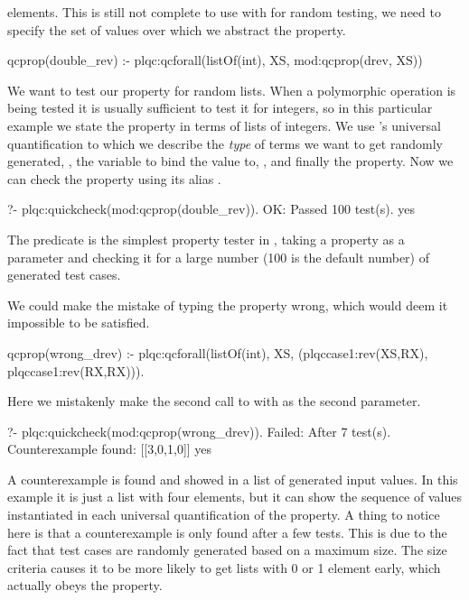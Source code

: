 elements.
%
This is still not complete to use with \plqc{} for random testing, we
need to specify the set of values over which we abstract the property.
%
\begin{yapcode}
 qcprop(double_rev) :-
   plqc:qcforall(listOf(int), XS,
                 mod:qcprop({drev, XS}))
\end{yapcode}
%
We want to test our  property for random  lists.
%
When a polymorphic operation is being tested it is usually sufficient
to test it for integers, so in this particular example
we state the property in terms of lists of integers.
%
We use \plqc{}'s universal quantification to which we describe the
\emph{type} of terms we want to get randomly generated,
, the variable to bind the value to, ,
and finally the property.
%
Now we can check the property using its alias .
\begin{yapcode}
   ?- plqc:quickcheck(mod:qcprop(double_rev)).
 OK: Passed 100 test(s).
 yes
\end{yapcode}
%
The  predicate is the simplest property tester in
\plqc{}, taking a property as a parameter and checking it for a large
number (100 is the default number) of generated test cases.


We could make the mistake of typing the property wrong, which would deem
it impossible to be satisfied.
%
\begin{yapcode}
 qcprop(wrong_drev) :-
   plqc:qcforall(listOf(int), XS,
                 (plqccase1:rev(XS,RX),
                  plqccase1:rev(RX,RX))).
\end{yapcode}
%
Here we mistakenly make the second call to  with  as
the second parameter.
%
\begin{yapcode}
   ?- plqc:quickcheck(mod:qcprop(wrong_drev)).
 Failed: After 7 test(s).
 Counterexample found: [[3,0,1,0]] 
 yes
\end{yapcode}
A counterexample is found and showed in a list of generated input
values.
%
In this example it is just a list with four elements, but it can show
the sequence of values instantiated in each universal quantification of
the property.
%
A thing to notice here is that a counterexample is only found after a
few tests.
%
This is due to the fact that test cases are randomly generated based on
a maximum size.
%
The size criteria causes it to be more likely to get lists with 0 or 1
element early, which actually obeys the property.


